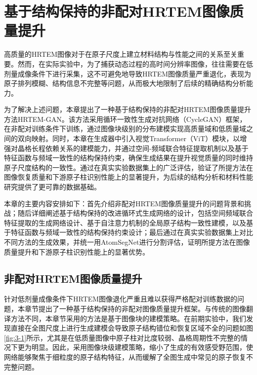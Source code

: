 \chapter{基于结构保持的非配对HRTEM图像质量提升}
高质量的HRTEM图像对于在原子尺度上建立材料结构与性能之间的关系至关重要。然而，在实际实验中，为了捕获动态过程的高时间分辨率图像，往往需要在低剂量成像条件下进行采集，这不可避免地导致HRTEM图像质量严重退化，表现为原子排列模糊、结构信息不完整等问题，从而极大地限制了后续的精确结构分析能力。

为了解决上述问题，本章提出了一种基于结构保持的非配对HRTEM图像质量提升方法HRTEM-GAN。该方法采用循环一致性生成对抗网络（CycleGAN）框架，在非配对训练条件下训练，通过图像块级别的分布建模实现高质量域和低质量域之间的双向映射。同时，本章在生成器中引入视觉Transformer（ViT）模块，以增强对晶格长程依赖关系的建模能力，并通过空间-频域联合特征提取机制以及基于特征函数与频域一致性的结构保持约束，确保生成结果在提升视觉质量的同时维持原子尺度结构的一致性。通过在真实实验数据集上的广泛评估，验证了所提方法在图像恢复质量和下游原子柱识别性能上的显著提升，为后续的结构分析和材料性能研究提供了更可靠的数据基础。

本章的主要内容安排如下：首先介绍非配对HRTEM图像质量提升的问题背景和挑战；随后详细阐述基于结构保持的改进循环式生成网络的设计，包括空间频域联合特征提取的生成网络设计、基于自注意力机制的全局原子结构一致性建模，以及基于特征函数与频域一致性的结构保持约束设计；最后通过在真实实验数据集上对比不同方法的生成效果，并统一用AtomSegNet进行分割评估，证明所提方法在图像质量提升和下游原子柱识别性能上的显著优势。



\section{非配对HRTEM图像质量提升}
针对低剂量成像条件下HRTEM图像退化严重且难以获得严格配对训练数据的问题，本章节提出了一种基于结构保持的非配对图像质量提升框架。与传统的图像翻译方法不同，本章节采用的方法是基于图像块的建模策略。在前期实验中，我们发现直接在全图尺度上进行生成建模会导致原子结构错位和恢复区域不全的问题如图\ref{fig:3-1}所示，尤其是在低质量图像中原子柱对比度较弱、晶格周期性不完整的情况下更为明显。因此，采用图像块级建模策略，缩小了生成的有效感受野范围，使网络能够聚焦于细粒度的原子结构特征，从而缓解了全图生成中常见的原子恢复不完整问题。

